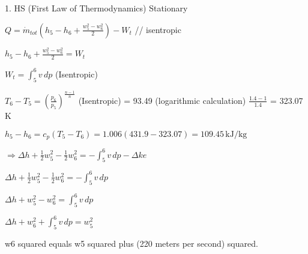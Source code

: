 1. HS (First Law of Thermodynamics)  
Stationary  

\( Q = \dot{m}_{tot} \left( h_5 - h_6 + \frac{w_5^2 - w_6^2}{2} \right) - W_t \) // isentropic  

\( h_5 - h_6 + \frac{w_5^2 - w_6^2}{2} = W_t \)  

\( W_t = \int_{5}^{6} v \, dp \) (Isentropic)  

\( T_6 - T_5 = \left( \frac{p_6}{p_5} \right)^{\frac{n-1}{n}} \)  
(Isentropic) = 93.49 (logarithmic calculation)  
\( \frac{1.4 - 1}{1.4} \)  
= 323.07 K  

\( h_5 - h_6 = c_p \left( T_5 - T_6 \right) = 1.006 \left( 431.9 - 323.07 \right) = 109.45 \, \text{kJ/kg} \)  

\( \Rightarrow \Delta h + \frac{1}{2} w_5^2 - \frac{1}{2} w_6^2 = - \int_{5}^{6} v \, dp - \Delta ke \)  

\( \Delta h + \frac{1}{2} w_5^2 - \frac{1}{2} w_6^2 = - \int_{5}^{6} v \, dp \)  

\( \Delta h + w_5^2 - w_6^2 = \int_{5}^{6} v \, dp \)  

\( \Delta h + w_6^2 + \int_{5}^{6} v \, dp = w_5^2 \)

w6 squared equals w5 squared plus (220 meters per second) squared.